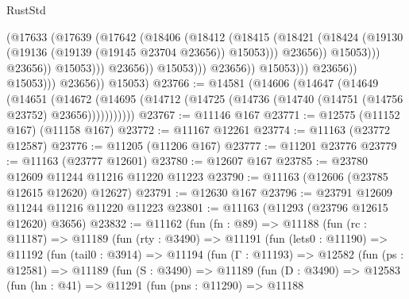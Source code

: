 \begin{lexlean}{RustStd}
\begin{coremodule}
                                              (@17633
                                                (@17639
                                                  (@17642
                                                    (@18406
                                                      (@18412
                                                        (@18415
                                                          (@18421
                                                            (@18424
                                                              (@19130
                                                                (@19136
                                                                  (@19139 (@19145 @23704 @23656))
                                                                  @15053)))
                                                            @23656))
                                                        @15053)))
                                                  @23656))
                                              @15053)))
                                        @23656))
                                    @15053)))
                              @23656))
                          @15053)))
                    @23656))
                @15053)))
          @23656))
      @15053)
@23766 := @14581
    (@14606
      (@14647
        (@14649
          (@14651
            (@14672
              (@14695 (@14712 (@14725 (@14736 (@14740 (@14751 (@14756 @23752) @23656)))))))))))
@23767 := @11146 @167
@23771 := @12575 (@11152 @167) (@11158 @167)
@23772 := @11167 @12261
@23774 := @11163 (@23772 @12587)
@23776 := @11205 (@11206 @167)
@23777 := @11201 @23776
@23779 := @11163 (@23777 @12601)
@23780 := @12607 @167
@23785 := @23780 @12609 @11244 @11216 @11220 @11223
@23790 := @11163 (@12606 (@23785 @12615 @12620) @12627)
@23791 := @12630 @167
@23796 := @23791 @12609 @11244 @11216 @11220 @11223
@23801 := @11163 (@11293 (@23796 @12615 @12620) @3656)
@23832 := @11162
    (fun (fn : @89) =>
    @11188
      (fun (rc : @11187) =>
      @11189
        (fun (rty : @3490) =>
        @11191
          (fun (lets0 : @11190) =>
          @11192
            (fun (tail0 : @3914) =>
            @11194
              (fun (Γ : @11193) =>
              @12582
                (fun (ps : @12581) =>
                @11189
                  (fun (S : @3490) =>
                  @11189
                    (fun (D : @3490) =>
                    @12583
                      (fun (hn : @41) =>
                      @11291
                        (fun (pns : @11290) =>
                        @11188

\end{coremodule}
\end{lexlean}
